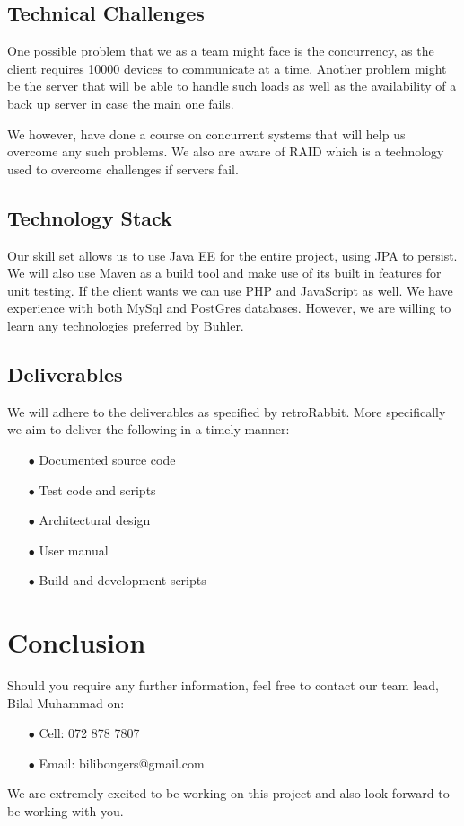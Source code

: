 \documentclass[a4paper,12pt]{article}
\begin{document}
	\subsection{Technical Challenges}
	One possible problem that we as a team might face is the concurrency, as the client requires 10000 devices to communicate at a time. Another problem might be the server that will be able to handle such loads as well as the availability of a back up server in case the main one fails.
	
	{\noindent}We however, have done a course on concurrent systems that will help us overcome any such problems. We also are aware of RAID which is a technology used to overcome challenges if servers fail. 
	
	\subsection{Technology Stack}
	Our skill set allows us to use Java EE for the entire project, using JPA to persist. We will also use Maven as a build tool and make use of its built in features for unit testing. If the client wants we can use PHP and JavaScript as well. We have experience with both MySql and PostGres databases. However, we are willing to learn any technologies preferred by Buhler. 
	
	\subsection{Deliverables}
	We will adhere to the deliverables as specified by retroRabbit. More specifically we aim to deliver the following in a timely manner:
	
	\begin{itemize}
		\item[$\bullet$]Documented source code
		\item[$\bullet$]Test code and scripts
		\item[$\bullet$]Architectural design
		\item[$\bullet$]User manual
		\item[$\bullet$]Build and development scripts
	\end{itemize} 
	
	\newpage
	\section{Conclusion}
	
	Should you require any further information, feel free to contact our team lead, Bilal Muhammad on:
	
	\begin{itemize}
		\item[$\bullet$]Cell: 072 878 7807
		\item[$\bullet$]Email: bilibongers@gmail.com
	\end{itemize}
	We are extremely excited to be working on this project and also look forward to be working with you.
	
	
\end{document}
